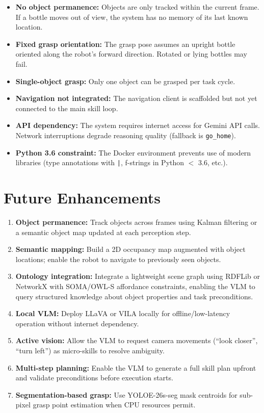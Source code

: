 \documentclass[12pt,a4paper]{report}
\begin{document}
\begin{itemize}
  \item \textbf{No object permanence:} Objects are only tracked within the current frame.
        If a bottle moves out of view, the system has no memory of its last known location.
  \item \textbf{Fixed grasp orientation:} The grasp pose assumes an upright bottle oriented
        along the robot's forward direction.  Rotated or lying bottles may fail.
  \item \textbf{Single-object grasp:} Only one object can be grasped per task cycle.
  \item \textbf{Navigation not integrated:} The navigation client is scaffolded but not
        yet connected to the main skill loop.
  \item \textbf{API dependency:} The system requires internet access for Gemini API calls.
        Network interruptions degrade reasoning quality (fallback is \texttt{go\_home}).
  \item \textbf{Python 3.6 constraint:} The Docker environment prevents use of modern
        libraries (type annotations with \texttt{|}, f-strings in Python $<$ 3.6, etc.).
\end{itemize}

\section{Future Enhancements}

\begin{enumerate}
  \item \textbf{Object permanence:} Track objects across frames using Kalman filtering
        or a semantic object map updated at each perception step.
  \item \textbf{Semantic mapping:} Build a 2D occupancy map augmented with object
        locations; enable the robot to navigate to previously seen objects.
  \item \textbf{Ontology integration:} Integrate a lightweight scene graph using RDFLib
        or NetworkX with SOMA/OWL-S affordance constraints, enabling the VLM to query
        structured knowledge about object properties and task preconditions.
  \item \textbf{Local VLM:} Deploy LLaVA or VILA locally for offline/low-latency
        operation without internet dependency.
  \item \textbf{Active vision:} Allow the VLM to request camera movements
        (``look closer'', ``turn left'') as micro-skills to resolve ambiguity.
  \item \textbf{Multi-step planning:} Enable the VLM to generate a full skill plan
        upfront and validate preconditions before execution starts.
  \item \textbf{Segmentation-based grasp:} Use YOLOE-26s-seg mask centroids for
        sub-pixel grasp point estimation when CPU resources permit.
\end{enumerate}
\end{document}
